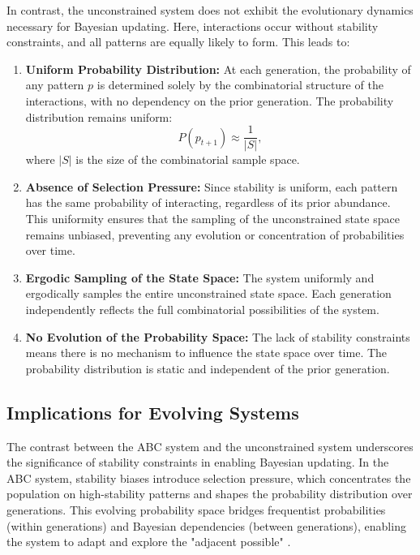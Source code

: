 \documentclass[%
 preprint, linenumbers,
 amsmath,amssymb,
 aps, physrev,
]{revtex4-2}
\begin{document}
In contrast, the unconstrained system does not exhibit the evolutionary dynamics necessary for Bayesian updating. Here, interactions occur without stability constraints, and all patterns are equally likely to form. This leads to:
\begin{enumerate}
    \item \textbf{Uniform Probability Distribution:} At each generation, the probability of any pattern \( p \) is determined solely by the combinatorial structure of the interactions, with no dependency on the prior generation. The probability distribution remains uniform:
    \[
    P(p_{t+1}) \approx \frac{1}{|S|},
    \]
    where \( |S| \) is the size of the combinatorial sample space.

    \item \textbf{Absence of Selection Pressure:} Since stability is uniform, each pattern has the same probability of interacting, regardless of its prior abundance. This uniformity ensures that the sampling of the unconstrained state space remains unbiased, preventing any evolution or concentration of probabilities over time.

    \item \textbf{Ergodic Sampling of the State Space:} The system uniformly and ergodically samples the entire unconstrained state space. Each generation independently reflects the full combinatorial possibilities of the system.

    \item \textbf{No Evolution of the Probability Space:} The lack of stability constraints means there is no mechanism to influence the state space over time. The probability distribution is static and independent of the prior generation.
\end{enumerate}

\subsection{Implications for Evolving Systems}

The contrast between the ABC system and the unconstrained system underscores the significance of stability constraints in enabling Bayesian updating. In the ABC system, stability biases introduce selection pressure, which concentrates the population on high-stability patterns and shapes the probability distribution over generations. This evolving probability space bridges frequentist probabilities (within generations) and Bayesian dependencies (between generations), enabling the system to adapt and explore the "adjacent possible" \cite{kauffman2000investigations}.
\end{document}
